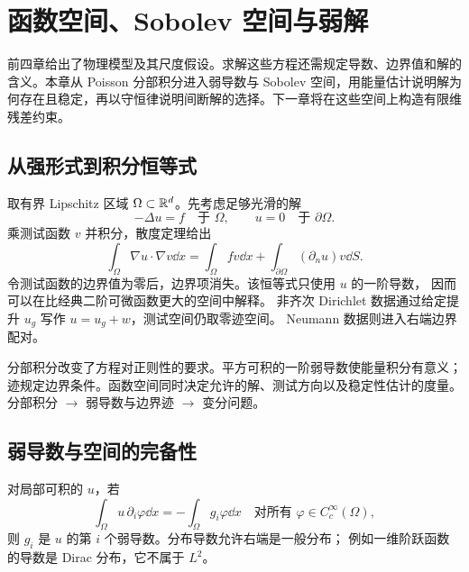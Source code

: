 \chapter{函数空间、Sobolev 空间与弱解}\label{ch:5}
\begin{chaptersummary}
前四章给出了物理模型及其尺度假设。求解这些方程还需规定导数、边界值和解的含义。本章从 Poisson 分部积分进入弱导数与 Sobolev 空间，用能量估计说明解为何存在且稳定，再以守恒律说明间断解的选择。下一章将在这些空间上构造有限维残差约束。
\end{chaptersummary}

\section{从强形式到积分恒等式}
取有界 Lipschitz 区域 $\Omega\subset\mathbb R^d$。先考虑足够光滑的解
\[
-\Delta u=f\quad\text{于 }\Omega,\qquad u=0\quad\text{于 }\partial\Omega.
\]
乘测试函数 $v$ 并积分，散度定理给出
\begin{equation}\label{eq:poisson-green}
\int_\Omega\nabla u\cdot\nabla v\dd x
=\int_\Omega fv\dd x+\int_{\partial\Omega}(\partial_nu)v\dd S.
\end{equation}
令测试函数的边界值为零后，边界项消失。该恒等式只使用 $u$ 的一阶导数，
因而可以在比经典二阶可微函数更大的空间中解释。
非齐次 Dirichlet 数据通过给定提升 $u_g$ 写作 $u=u_g+w$，测试空间仍取零迹空间。
Neumann 数据则进入右端边界配对。

{分部积分改变了方程对正则性的要求。平方可积的一阶弱导数使能量积分有意义；迹规定边界条件。函数空间同时决定允许的解、测试方向以及稳定性估计的度量。}
{分部积分 $\longrightarrow$ 弱导数与边界迹 $\longrightarrow$ 变分问题。}

\section{弱导数与空间的完备性}
对局部可积的 $u$，若
\[
\int_\Omega u\,\partial_i\varphi\dd x=-\int_\Omega g_i\varphi\dd x
\quad\text{对所有 }\varphi\in C_c^\infty(\Omega),
\]
则 $g_i$ 是 $u$ 的第 $i$ 个弱导数。分布导数允许右端是一般分布；
例如一维阶跃函数的导数是 Dirac 分布，它不属于 $L^2$。

